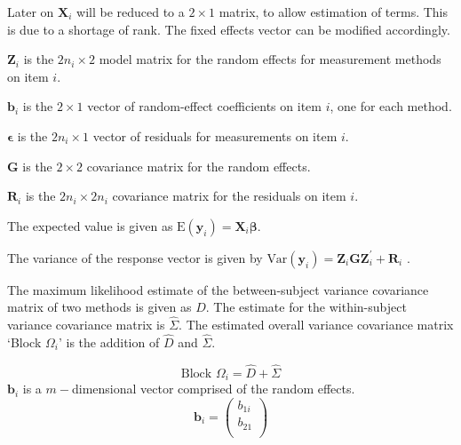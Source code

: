 \documentclass[12pt, a4paper]{report}
\theoremstyle{plain}
\theoremstyle{definition}
\theoremstyle{remark}
\begin{document}

Later on $\boldsymbol{X}_i$ will be reduced to a $2 \times 1$ matrix, to allow estimation of terms. This is due to a shortage of rank. The fixed effects vector can be modified accordingly.

$\boldsymbol{Z}_i$ is the $2n_i \times  2$ model matrix for the random effects for measurement methods on item $i$.\\
\bigskip

$\boldsymbol{b}_i$ is the $2 \times  1$ vector of random-effect coefficients on item $i$, one for each method.

$\boldsymbol{\epsilon}$  is the $2n_i \times  1$ vector of residuals for measurements on item $i$.\\
\bigskip

$\boldsymbol{G}$ is the $2 \times  2$ covariance matrix for the random effects.

$\boldsymbol{R}_i$ is the $2n_i \times  2n_i$ covariance matrix for the residuals on item $i$.

The expected value is given as $\mbox{E}(\boldsymbol{y}_i) = \boldsymbol{X}_i\boldsymbol{\beta}.$ \citep{hamlett}\\
\bigskip

The variance of the response vector is given by $\mbox{Var}(\boldsymbol{y}_i)  = \boldsymbol{Z}_i \boldsymbol{G} \boldsymbol{Z}_i^{\prime} + \boldsymbol{R}_i$ \citep{hamlett}.


The maximum likelihood estimate of the between-subject variance
covariance matrix of two methods is given as $D$. The estimate for
the within-subject variance covariance matrix is $\hat{\Sigma}$.
The estimated overall variance covariance matrix `Block $\Omega_{i}$' is the addition of $\hat{D}$ and $\hat{\Sigma}$.

\begin{equation}
\mbox{Block  }\Omega_{i} = \hat{D} + \hat{\Sigma}
\end{equation}
$\boldsymbol{b}_{i}$ is a $m-$dimensional vector comprised of
the random effects.
\begin{equation}
\boldsymbol{b}_{i} = \left( \begin{array}{c}
b_{1i} \\
b_{21}  \\
\end{array}\right)
\end{equation}
\end{document}

